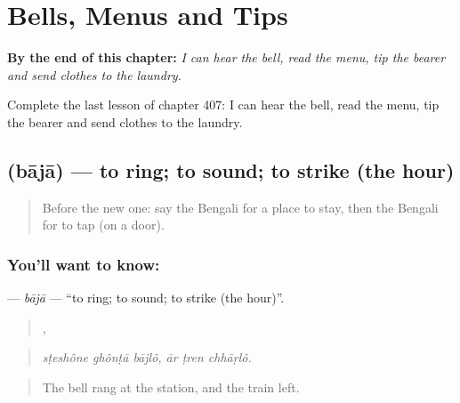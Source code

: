 
\chapter{Bells, Menus and Tips}
\label{ch:bn-bells-menus-and-tips}

\begin{chapteropening}
\textbf{By the end of this chapter:} \emph{I can hear the bell, read the menu, tip the bearer and send clothes to the laundry.}

Complete the last lesson of chapter 407: I can hear the bell, read the menu, tip the bearer and send clothes to the laundry.
\end{chapteropening}

\section[\texorpdfstring{\bn{বাজা} (bājā)}{বাজা (bājā)}]{ (bājā) — to ring; to sound; to strike (the hour)}

\label{lesson:BN-C407-baja}



\begin{quote}
Before the new one: say the Bengali for a place to stay, then the Bengali for to tap (on a door).
\end{quote}

\subsection*{You'll want to know: }
\textbf{} — \emph{bājā} — \textquotedblleft{}to ring; to sound; to strike (the hour)\textquotedblright{}.

\begin{quote}
  ,   
\end{quote}

\begin{quote}
\emph{sṭeshône ghônṭā bājlô, ār ṭren chhāṛlô.}
\end{quote}

\begin{quote}
The bell rang at the station, and the train left.
\end{quote}

